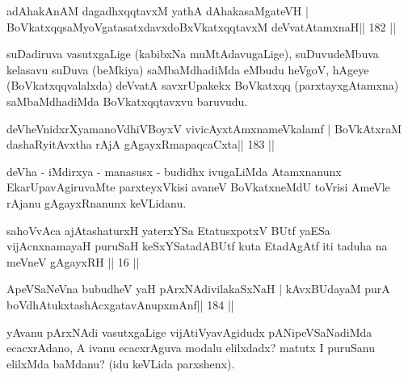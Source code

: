 
\begin{shl}
adAhakAnAM dagadhxqqtavxM yathA dAhakasaMgateVH |
BoVkatxqqsaMyoVgatasatxdavxdoBxVkatxqqtavxM deVvatAtamxnaH\hfill || 182 ||
\end{shl}

\begin{artha}
suDadiruva vasutxgaLige (kabibxNa muMtAdavugaLige), suDuvudeMbuva kelasavu suDuva (beMkiya) saMbaMdhadiMda eMbudu heVgoV, hAgeye (BoVkatxqqvalalxda) deVvatA savxrUpakekx BoVkatxqq (parxtayxgAtamxna) saMbaMdhadiMda BoVkatxqqtavxvu baruvudu.
\end{artha}


\begin{shl}
deVheVnidxrXyamanoVdhiVBoyxV vivicAyx\s\s tAmxnameVkalamf |
BoVkAtxraM dashaRyitAvx\s tha rAjA gAgayxRmapaqcaCxta\hfill || 183 ||
\end{shl}

\begin{artha}
deVha - iMdirxya - manasusx - budidhx ivugaLiMda Atamxnanunx EkarUpavAgiruvaMte parxteyxVkisi avaneV BoVkatxneMdU toVrisi AmeVle rAjanu gAgayxRnanunx keVLidanu.
\end{artha}


\begin{shl}
sahoVvAca ajAtashaturxH yaterxYSa EtatusxpotxV\s
BUtf yaESa vijAcnxnamayaH puruSaH keSxYSatadABUtf
kuta EtadAgAtf iti taduha na meVneV gAgayxRH || 16 ||
\end{shl}

\begin{shl}
ApeVSaNeVna bubudheV yaH pArxNAdivilakaSxNaH |
kAvxBUdayaM purA boVdhAtukxtashAcx\s\s gatavAnupxmAnf\hfill || 184 ||
\end{shl}

\begin{artha}
yAvanu pArxNAdi vasutxgaLige vijAtiVyavAgidudx pANipeVSaNadiMda  ecacxrAdano, A ivanu ecacxrAguva modalu elilxdadx? matutx I puruSanu elilxMda baMdanu? (idu keVLida parxshenx).
\end{artha}


